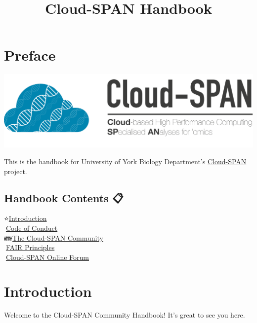 \documentclass[
]{book}
\title{Cloud-SPAN Handbook}
\author{}
\date{\vspace{-2.5em}}
\begin{document}
\maketitle

{
\setcounter{tocdepth}{1}
\tableofcontents
}
\hypertarget{preface}{%
\chapter*{Preface}\label{preface}}

\includegraphics{images/cloud-span-logo-text.png}

This is the handbook for University of York Biology Department's \href{https://cloud-span.york.ac.uk/}{Cloud-SPAN} project.

\hypertarget{handbook-contents}{%
\section*{Handbook Contents 📋}\label{handbook-contents}}

⭐\href{https://cloud-span.github.io/CloudSPAN-handbook/introduction.html}{Introduction}\\
🤝\href{https://cloud-span.github.io/CloudSPAN-handbook/code-of-conduct.html}{Code of Conduct}\\
👪\href{https://cloud-span.github.io/CloudSPAN-handbook/the-cloud-span-commmunity.html}{The Cloud-SPAN Community}\\
📌\href{https://cloud-span.github.io/CloudSPAN-handbook/fair-principles.html}{FAIR Principles}\\
📜\href{https://cloud-span.github.io/CloudSPAN-handbook/forum.html}{Cloud-SPAN Online Forum}

\hypertarget{introduction}{%
\chapter{Introduction}\label{introduction}}

Welcome to the Cloud-SPAN Community Handbook! It's great to see you here.
\end{document}
